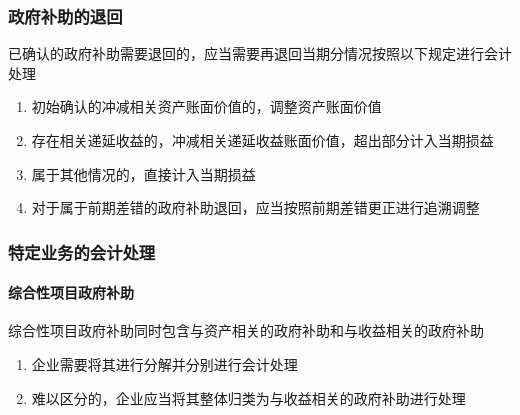 \documentclass[UTF8,12pt]{ctexart}
\numberwithin{equation}{section} %
\numberwithin{figure}{section}
\numberwithin{table}{section}
\begin{document}
	\subsubsection{政府补助的退回}
	已确认的政府补助需要退回的，应当需要再退回当期分情况按照以下规定进行会计处理
	\begin{enumerate}
		\item 初始确认的冲减相关资产账面价值的，调整资产账面价值
		
		\item 存在相关递延收益的，冲减相关递延收益账面价值，超出部分计入当期损益
		
		\item 属于其他情况的，直接计入当期损益
		
		\item 对于属于前期差错的政府补助退回，应当按照前期差错更正进行追溯调整
	\end{enumerate}
	\subsubsection{特定业务的会计处理}
	\paragraph{综合性项目政府补助}
	综合性项目政府补助同时包含与资产相关的政府补助和与收益相关的政府补助
	\begin{enumerate}
		\item 企业需要将其进行分解并分别进行会计处理
		
		\item 难以区分的，企业应当将其整体归类为与收益相关的政府补助进行处理
	\end{enumerate}
	
\end{document}
